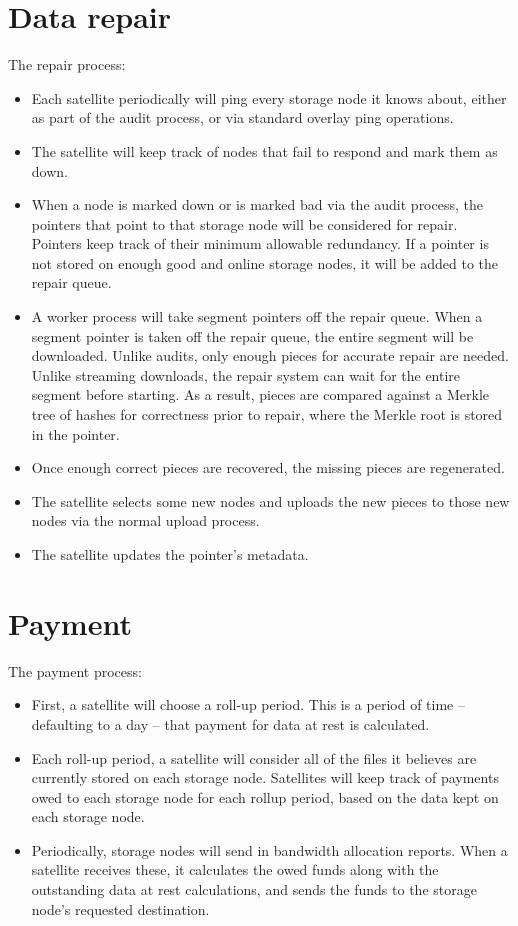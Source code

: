 \documentclass[11pt,fleqn,openany]{book}
\begin{document}
\section{Data repair}

The repair process:

\begin{itemize}
\item Each satellite periodically will ping every storage node it knows
about,
  either as part of the audit process, or via standard overlay ping operations.
\item The satellite will keep track of nodes that fail to respond and mark
  them as down.
\item When a node is marked down or is marked bad via the audit process, the
  pointers that point to that storage node will be considered for repair.
  Pointers
  keep track of their minimum allowable redundancy. If a pointer is not stored
  on enough good and online storage nodes, it will be added to the repair queue.
\item A worker process will take segment pointers off the repair queue. When
  a segment pointer is taken off the repair queue, the entire segment will be
  downloaded. Unlike audits, only enough pieces for accurate repair are needed.
  Unlike streaming downloads, the repair system can wait for the entire segment
  before starting. As a result, pieces are compared against a Merkle tree of
  hashes for correctness prior to repair, where the Merkle root is stored in
  the pointer.
\item Once enough correct pieces are recovered, the missing pieces are
  regenerated.
\item The satellite selects some new nodes and uploads the new pieces to
  those new nodes via the normal upload process.
\item The satellite updates the pointer's metadata.
\end{itemize}

\section{Payment}

The payment process:

\begin{itemize}
\item First, a satellite will choose a roll-up period. This is a period of
  time -- defaulting to a day -- that payment for data at rest is calculated.
\item Each roll-up period, a satellite will consider all of the files it
  believes are currently stored on each storage node. Satellites will keep track
of payments owed to each storage node for each rollup period, based on
the data kept on each storage node.
\item Periodically, storage nodes will send in bandwidth allocation reports.
When a
  satellite receives these, it calculates the owed funds along with the
  outstanding data at rest calculations, and sends the funds to the storage
  node's requested destination.
\end{itemize}
\end{document}
